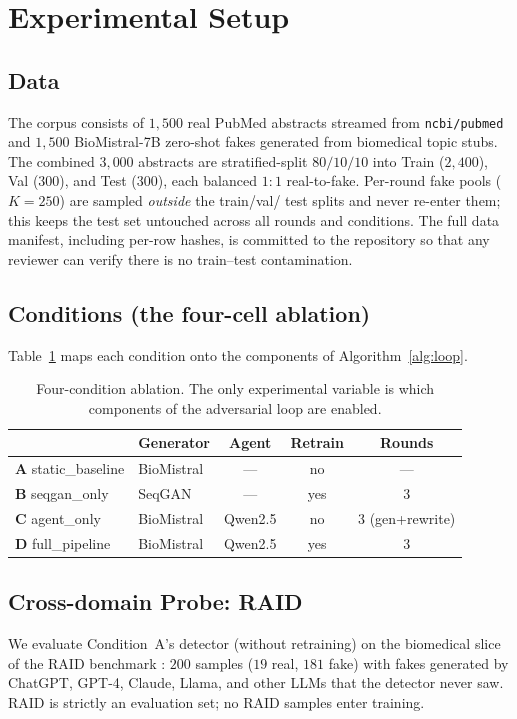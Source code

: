 \section{Experimental Setup}
\label{sec:setup}

\subsection{Data}
\label{ssec:data}
The corpus consists of \(1{,}500\) real PubMed abstracts streamed from
\texttt{ncbi/pubmed} and \(1{,}500\) BioMistral-7B zero-shot fakes
generated from biomedical topic stubs. The combined \(3{,}000\) abstracts
are stratified-split \(80/10/10\) into Train (\(2{,}400\)), Val
(\(300\)), and Test (\(300\)), each balanced \(1\!:\!1\) real-to-fake.
Per-round fake pools (\(K=250\)) are sampled \emph{outside} the train/val/
test splits and never re-enter them; this keeps the test set untouched
across all rounds and conditions. The full data manifest, including
per-row hashes, is committed to the repository so that any reviewer can
verify there is no train--test contamination.

\subsection{Conditions (the four-cell ablation)}
\label{ssec:conditions}
Table~\ref{tab:conditions} maps each condition onto the components of
Algorithm~\ref{alg:loop}.

\begin{table}[t]
\caption{Four-condition ablation. The only experimental variable is which
components of the adversarial loop are enabled.}
\label{tab:conditions}
\centering
\renewcommand{\arraystretch}{1.15}
\begin{tabular}{@{}llccc@{}}
\toprule
& \textbf{Generator} & \textbf{Agent} & \textbf{Retrain} & \textbf{Rounds} \\
\midrule
\textbf{A} static\_baseline & BioMistral & --- & no  & --- \\
\textbf{B} seqgan\_only     & SeqGAN     & --- & yes & 3 \\
\textbf{C} agent\_only      & BioMistral & Qwen2.5 & no  & 3 (gen+rewrite) \\
\textbf{D} full\_pipeline   & BioMistral & Qwen2.5 & yes & 3 \\
\bottomrule
\end{tabular}
\end{table}

\subsection{Cross-domain Probe: RAID}
\label{ssec:raid}
We evaluate Condition~A's detector (without retraining) on the biomedical
slice of the RAID benchmark \cite{dugan2024raid}: \(200\) samples
(\(19\) real, \(181\) fake) with fakes generated by ChatGPT, GPT-4,
Claude, Llama, and other LLMs that the detector never saw. RAID is
strictly an evaluation set; no RAID samples enter training.

